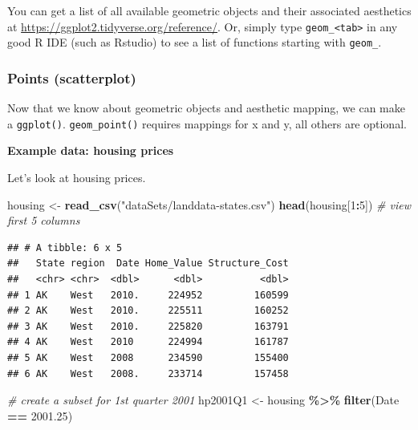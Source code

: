\documentclass[
]{book}
\newenvironment{Shaded}{\begin{snugshade}}{\end{snugshade}}
\newcommand{\CommentTok}[1]{\textcolor[rgb]{0.56,0.35,0.01}{\textit{#1}}}
\newcommand{\DecValTok}[1]{\textcolor[rgb]{0.00,0.00,0.81}{#1}}
\newcommand{\FloatTok}[1]{\textcolor[rgb]{0.00,0.00,0.81}{#1}}
\newcommand{\KeywordTok}[1]{\textcolor[rgb]{0.13,0.29,0.53}{\textbf{#1}}}
\newcommand{\NormalTok}[1]{#1}
\newcommand{\OperatorTok}[1]{\textcolor[rgb]{0.81,0.36,0.00}{\textbf{#1}}}
\newcommand{\StringTok}[1]{\textcolor[rgb]{0.31,0.60,0.02}{#1}}
\begin{document}
You can get a list of all available geometric objects and their associated aesthetics at \url{https://ggplot2.tidyverse.org/reference/}. Or, simply type \texttt{geom\_\textless{}tab\textgreater{}} in any good R IDE (such as Rstudio) to see a list of functions starting with \texttt{geom\_}.

\hypertarget{points-scatterplot}{%
\subsubsection{Points (scatterplot)}\label{points-scatterplot}}

Now that we know about geometric objects and aesthetic mapping, we can make a \texttt{ggplot()}. \texttt{geom\_point()} requires mappings for x and y, all others are optional.

\textbf{Example data: housing prices}

Let's look at housing prices.

\begin{Shaded}
\begin{Highlighting}[]
\NormalTok{housing \textless{}{-}}\StringTok{ }\KeywordTok{read\_csv}\NormalTok{(}\StringTok{"dataSets/landdata{-}states.csv"}\NormalTok{)}
\KeywordTok{head}\NormalTok{(housing[}\DecValTok{1}\OperatorTok{:}\DecValTok{5}\NormalTok{]) }\CommentTok{\# view first 5 columns}
\end{Highlighting}
\end{Shaded}

\begin{verbatim}
## # A tibble: 6 x 5
##   State region  Date Home_Value Structure_Cost
##   <chr> <chr>  <dbl>      <dbl>          <dbl>
## 1 AK    West   2010.     224952         160599
## 2 AK    West   2010.     225511         160252
## 3 AK    West   2010.     225820         163791
## 4 AK    West   2010      224994         161787
## 5 AK    West   2008      234590         155400
## 6 AK    West   2008.     233714         157458
\end{verbatim}

\begin{Shaded}
\begin{Highlighting}[]
\CommentTok{\# create a subset for 1st quarter 2001}
\NormalTok{hp2001Q1 \textless{}{-}}\StringTok{ }\NormalTok{housing }\OperatorTok{\%\textgreater{}\%}\StringTok{ }\KeywordTok{filter}\NormalTok{(Date }\OperatorTok{==}\StringTok{ }\FloatTok{2001.25}\NormalTok{)}
\end{Highlighting}
\end{Shaded}
\end{document}
